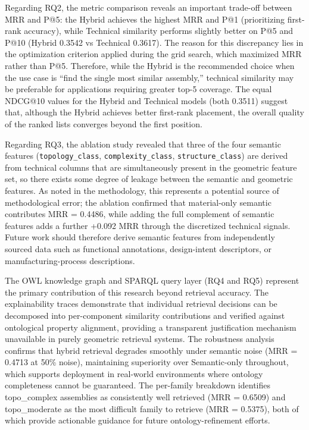 \documentclass[preprint,12pt]{elsarticle}
\begin{document}
Regarding RQ2, the metric comparison reveals an important trade-off between MRR and P@5: the Hybrid achieves the highest MRR and P@1 (prioritizing first-rank accuracy), while Technical similarity performs slightly better on P@5 and P@10 (Hybrid 0.3542 vs Technical 0.3617).
The reason for this discrepancy lies in the optimization criterion applied during the grid search, which maximized MRR rather than P@5.
Therefore, while the Hybrid is the recommended choice when the use case is ``find the single most similar assembly,'' technical similarity may be preferable for applications requiring greater top-5 coverage.
The equal NDCG@10 values for the Hybrid and Technical models (both 0.3511) suggest that, although the Hybrid achieves better first-rank placement, the overall quality of the ranked lists converges beyond the first position.

Regarding RQ3, the ablation study revealed that three of the four semantic features (\texttt{topology\_class}, \texttt{complexity\_class}, \texttt{structure\_class}) are derived from technical columns that are simultaneously present in the geometric feature set, so there exists some degree of leakage between the semantic and geometric features.
As noted in the methodology, this represents a potential source of methodological error; the ablation confirmed that material-only semantic contributes MRR = 0.4486, while adding the full complement of semantic features adds a further +0.092 MRR through the discretized technical signals.
Future work should therefore derive semantic features from independently sourced data such as functional annotations, design-intent descriptors, or manufacturing-process descriptions.

The OWL knowledge graph and SPARQL query layer (RQ4 and RQ5) represent the primary contribution of this research beyond retrieval accuracy.
The explainability traces demonstrate that individual retrieval decisions can be decomposed into per-component similarity contributions and verified against ontological property alignment, providing a transparent justification mechanism unavailable in purely geometric retrieval systems.
The robustness analysis confirms that hybrid retrieval degrades smoothly under semantic noise (MRR = 0.4713 at 50\% noise), maintaining superiority over Semantic-only throughout, which supports deployment in real-world environments where ontology completeness cannot be guaranteed.
The per-family breakdown identifies topo\_complex assemblies as consistently well retrieved (MRR = 0.6509) and topo\_moderate as the most difficult family to retrieve (MRR = 0.5375), both of which provide actionable guidance for future ontology-refinement efforts.
\end{document}
